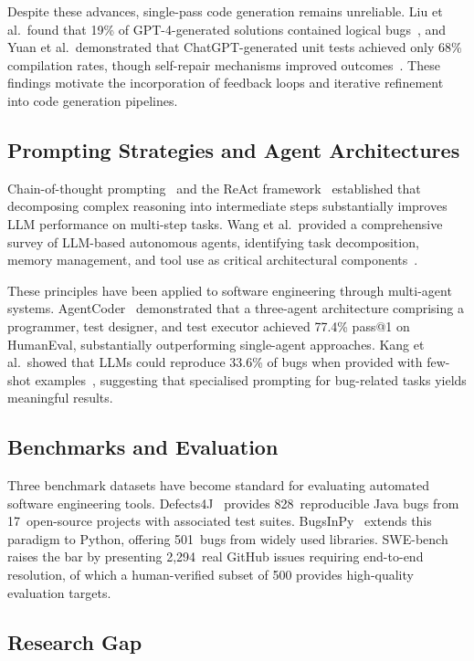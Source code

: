 \documentclass[conference]{IEEEtran}
\begin{document}
Despite these advances, single-pass code generation remains unreliable. Liu et al.\ found that 19\% of GPT-4-generated solutions contained logical bugs~\cite{liu2023}, and Yuan et al.\ demonstrated that ChatGPT-generated unit tests achieved only 68\% compilation rates, though self-repair mechanisms improved outcomes~\cite{yuan2023}. These findings motivate the incorporation of feedback loops and iterative refinement into code generation pipelines.

\subsection{Prompting Strategies and Agent Architectures}

Chain-of-thought prompting~\cite{wei2022} and the ReAct framework~\cite{yao2023} established that decomposing complex reasoning into intermediate steps substantially improves LLM performance on multi-step tasks. Wang et al.\ provided a comprehensive survey of LLM-based autonomous agents, identifying task decomposition, memory management, and tool use as critical architectural components~\cite{wang2024}.

These principles have been applied to software engineering through multi-agent systems. AgentCoder~\cite{huang2023} demonstrated that a three-agent architecture comprising a programmer, test designer, and test executor achieved 77.4\% pass@1 on HumanEval, substantially outperforming single-agent approaches. Kang et al.\ showed that LLMs could reproduce 33.6\% of bugs when provided with few-shot examples~\cite{kang2023}, suggesting that specialised prompting for bug-related tasks yields meaningful results.

\subsection{Benchmarks and Evaluation}

Three benchmark datasets have become standard for evaluating automated software engineering tools. Defects4J~\cite{just2014} provides 828~reproducible Java bugs from 17~open-source projects with associated test suites. BugsInPy~\cite{widyasari2020} extends this paradigm to Python, offering 501~bugs from widely used libraries. SWE-bench~\cite{jimenez2024} raises the bar by presenting 2,294~real GitHub issues requiring end-to-end resolution, of which a human-verified subset of 500 provides high-quality evaluation targets.

\subsection{Research Gap}
\end{document}
